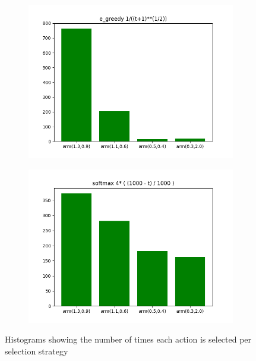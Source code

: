 \documentclass[letterpaper]{article}
\begin{document}
\begin{figure}[H]
    \begin{subfigure}{.5\textwidth}
    \centering
    \includegraphics[width=1\linewidth]{images/assign3/ex3/arms_e_greedy_t}
    \caption{}
    \label{fig:arms_e_greedy_t_ex3}
    \end{subfigure}
    \begin{subfigure}{.5\textwidth}
      \centering
      \includegraphics[width=1\linewidth]{images/assign3/ex3/arms_softmax_t}
      \caption{}
      \label{fig:arms_softmax_t_ex3}
    \end{subfigure}
    \caption{Histograms showing the number of times each action is selected
    per selection strategy}
    \label{fig:arms_ex3}
\end{figure}
\end{document}
